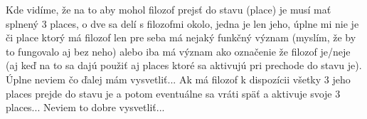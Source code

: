\documentclass[a4paper]{article}
\begin{document}
Kde vidíme, že na to aby mohol filozof prejsť do stavu (place) je musí mať splnený 3 places, o dve sa delí s filozofmi okolo, jedna je len jeho, úplne mi nie je či place ktorý má filozof len pre seba má nejaký funkčný význam (myslím, že by to fungovalo aj bez neho) alebo iba má význam ako označenie že filozof je/neje (aj keď na to sa dajú použiť aj places ktoré sa aktivujú pri prechode do stavu je). Úplne neviem čo ďalej mám vysvetliť... Ak má filozof k dispozícii všetky 3 jeho places prejde do stavu je a potom eventuálne sa vráti späť a aktivuje svoje 3 places... Neviem to dobre vysvetliť... 
\end{document}
